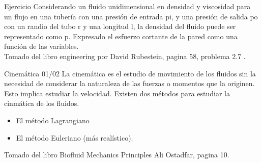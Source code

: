 \begin{frame}{Ejercicio}
\justifying
Considerando un fluido unidimensional en densidad y viscosidad para un flujo en una tubería con una presión de entrada pi, y una presión de salida po con un randio del tubo r y una longitud l, la densidad del fluido puede ser representado como p. Expresado el esfuerzo cortante de la pared como una función de las variables. \\
{\tiny Tomado del libro engineering por David Rubestein, pagina 58, problema 2.7 .}
\end{frame}

\begin{frame}{Cinemática 01/02}
\justifying
La cinemática es el estudio de movimiento de los fluidos sin la necesidad de considerar la naturaleza de las fuerzas o momentos que la originen. Esto implica estudiar la velocidad.
Existen dos métodos para estudiar la cinmática de los fluidos.
\begin{itemize}
\item El método Lagrangiano
\item El método Euleriano (más realístico).
\end{itemize}
{\tiny Tomado del libro Biofluid Mechanics Principles Ali Ostadfar, pagina 10.}
\end{frame}
	
